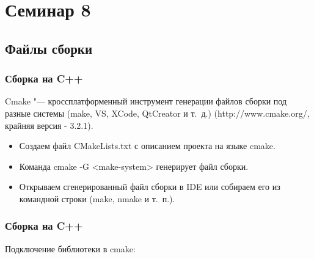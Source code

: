 \documentclass[default]{beamer}
\begin{document}
	\section{Семинар 8}
	\subsection{Файлы сборки}	
	\begin{frame}
		\frametitle{Сборка на C++}
		
		Cmake "--- кроссплатформенный инструмент генерации файлов сборки под разные системы (make, VS, XCode, QtCreator и т.~д.) (http://www.cmake.org/, крайняя версия - 3.2.1).
		\begin{itemize}
			\item Создаем файл CMakeLists.txt с описанием проекта на языке cmake.
			\item Команда cmake -G <make-system> генерирует файл сборки.
			\item Открываем сгенерированный файл сборки в IDE или собираем его из командной строки (make, nmake и т.~п.).
		\end{itemize}
		
		\lstCMake
	\end{frame}

	\begin{frame}
		\frametitle{Сборка на C++}
		
		Подключение библиотеки в cmake: 
		
		\lstCMakeLib
	\end{frame}
\end{document}
